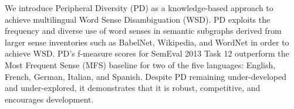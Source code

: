 We introduce Peripheral Diversity (PD) as a knowledge-based approach to achieve multilingual Word Sense Disambiguation (WSD). PD exploits the frequency and
 diverse use of word senses in semantic subgraphs derived from larger sense
 inventories such as BabelNet, Wikipedia, and WordNet in order to achieve WSD.
 PD's f-measure scores for SemEval 2013 Task 12 outperform the Most Frequent
 Sense (MFS) baseline for two of the five languages: English, French, German,
 Italian, and Spanish. Despite PD remaining under-developed and under-explored,
 it demonstrates that it is robust, competitive, and encourages development.

